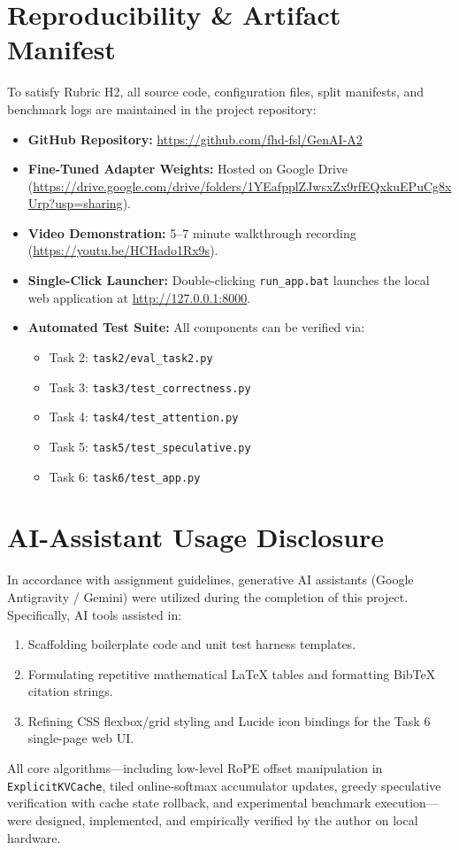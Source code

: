 \documentclass[conference]{IEEEtran}
\begin{document}
\section{Reproducibility \& Artifact Manifest}
To satisfy Rubric H2, all source code, configuration files, split manifests, and benchmark logs are maintained in the project repository:
\begin{itemize}
    \item \textbf{GitHub Repository:} \url{https://github.com/fhd-fsl/GenAI-A2}
    \item \textbf{Fine-Tuned Adapter Weights:} Hosted on Google Drive (\url{https://drive.google.com/drive/folders/1YEafpplZJwsxZx9rfEQxkuEPuCg8xUrp?usp=sharing}).
    \item \textbf{Video Demonstration:} 5--7 minute walkthrough recording (\url{https://youtu.be/HCHado1Rx9s}).
    \item \textbf{Single-Click Launcher:} Double-clicking \texttt{run\_app.bat} launches the local web application at \url{http://127.0.0.1:8000}.
    \item \textbf{Automated Test Suite:} All components can be verified via:
    \begin{itemize}
        \item Task 2: \texttt{task2/eval\_task2.py}
        \item Task 3: \texttt{task3/test\_correctness.py}
        \item Task 4: \texttt{task4/test\_attention.py}
        \item Task 5: \texttt{task5/test\_speculative.py}
        \item Task 6: \texttt{task6/test\_app.py}
    \end{itemize}
\end{itemize}

\section{AI-Assistant Usage Disclosure}
In accordance with assignment guidelines, generative AI assistants (Google Antigravity / Gemini) were utilized during the completion of this project. Specifically, AI tools assisted in:
\begin{enumerate}
    \item Scaffolding boilerplate code and unit test harness templates.
    \item Formulating repetitive mathematical LaTeX tables and formatting BibTeX citation strings.
    \item Refining CSS flexbox/grid styling and Lucide icon bindings for the Task 6 single-page web UI.
\end{enumerate}
All core algorithms—including low-level RoPE offset manipulation in \texttt{ExplicitKVCache}, tiled online-softmax accumulator updates, greedy speculative verification with cache state rollback, and experimental benchmark execution—were designed, implemented, and empirically verified by the author on local hardware.
\end{document}
